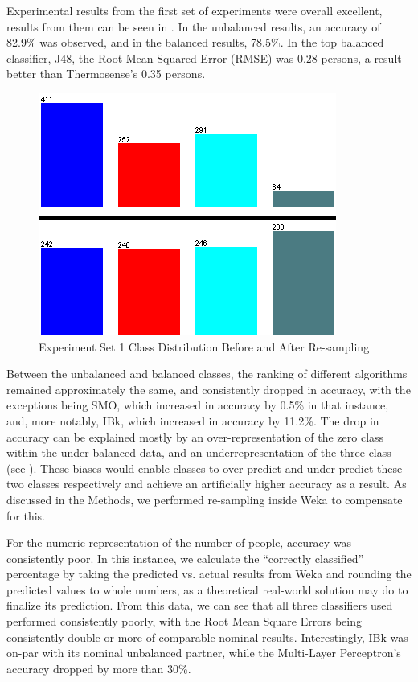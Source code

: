 \documentclass[../thesis/thesis.tex]{subfiles}
\begin{document}
Experimental results from the first set of experiments were overall excellent, results from them can be seen in . In the unbalanced results, an accuracy of 82.9\% was observed, and in the balanced results, 78.5\%. In the top balanced classifier, J48, the Root Mean Squared Error (RMSE) was 0.28 persons, a result better than Thermosense's 0.35 persons.

\begin{figure}
\centering
\includegraphics{../diagrams/temp/resample.png}
\caption{Experiment Set 1 Class Distribution Before and After Re-sampling}
\label{fig:results:resample}
\end{figure}

Between the unbalanced and balanced classes, the ranking of different algorithms remained approximately the same, and consistently dropped in accuracy, with the exceptions being SMO, which increased in accuracy by 0.5\% in that instance, and, more notably, IBk, which increased in accuracy by 11.2\%. The drop in accuracy can be explained mostly by an over-representation of the zero class within the under-balanced data, and an underrepresentation of the three class (see ). These biases would enable classes to over-predict and under-predict these two classes respectively and achieve an artificially higher accuracy as a result. As discussed in the Methods, we performed re-sampling inside Weka to compensate for this.

For the numeric representation of the number of people, accuracy was consistently poor. In this instance, we calculate the ``correctly classified'' percentage by taking the predicted vs. actual results from Weka and rounding the predicted values to whole numbers, as a theoretical real-world solution may do to finalize its prediction. From this data, we can see that all three classifiers used performed consistently poorly, with the Root Mean Square Errors being consistently double or more of comparable nominal results. Interestingly, IBk was on-par with its nominal unbalanced partner, while the Multi-Layer Perceptron's accuracy dropped by more than 30\%.
\end{document}

